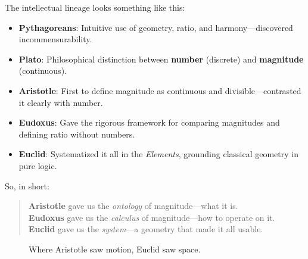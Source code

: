 \medskip

The intellectual lineage looks something like this:

\begin{itemize}
    \item \textbf{Pythagoreans}: Intuitive use of geometry, ratio, and harmony—discovered incommensurability.
    \item \textbf{Plato}: Philosophical distinction between \textbf{number} (discrete) and \textbf{magnitude} (continuous).
    \item \textbf{Aristotle}: First to define magnitude as continuous and divisible—contrasted it clearly with number.
    \item \textbf{Eudoxus}: Gave the rigorous framework for comparing magnitudes and defining ratio without numbers.
    \item \textbf{Euclid}: Systematized it all in the \textit{Elements}, grounding classical geometry in pure logic.
\end{itemize}

So, in short:

\begin{quote}
\textbf{Aristotle} gave us the \textit{ontology} of magnitude—what it is. \\
\textbf{Eudoxus} gave us the \textit{calculus} of magnitude—how to operate on it. \\
\textbf{Euclid} gave us the \textit{system}—a geometry that made it all usable.
\end{quote}




\begin{figure}[H]
\centering
{}
\caption{Where Aristotle saw motion, Euclid saw space.}
\end{figure}



